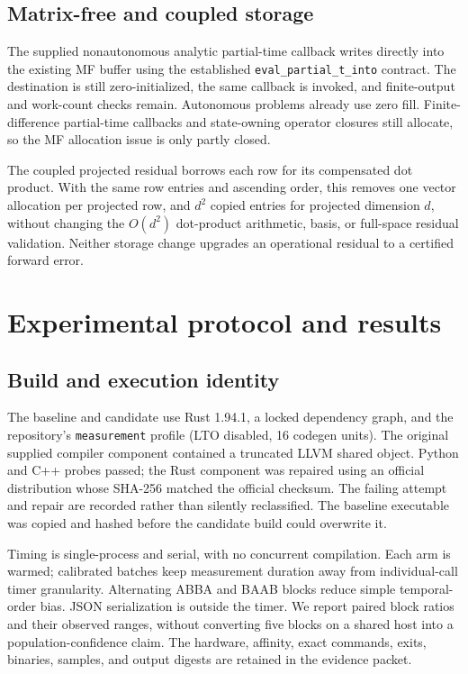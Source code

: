 \documentclass[aps,prd,reprint,amsmath,amssymb,longbibliography,nofootinbib]{revtex4-2}
\newcommand{\code}[1]{\texttt{#1}}
\begin{document}
\subsection{Matrix-free and coupled storage}
The supplied nonautonomous analytic partial-time callback writes directly into the existing MF buffer using the established \code{eval\_partial\_t\_into} contract. The destination is still zero-initialized, the same callback is invoked, and finite-output and work-count checks remain. Autonomous problems already use zero fill. Finite-difference partial-time callbacks and state-owning operator closures still allocate, so the MF allocation issue is only partly closed.

The coupled projected residual borrows each row for its compensated dot product. With the same row entries and ascending order, this removes one vector allocation per projected row, and $d^2$ copied entries for projected dimension $d$, without changing the $O(d^2)$ dot-product arithmetic, basis, or full-space residual validation. Neither storage change upgrades an operational residual to a certified forward error.

\section{Experimental protocol and results}
\label{sec:experiments}
\subsection{Build and execution identity}
The baseline and candidate use Rust 1.94.1, a locked dependency graph, and the repository's \code{measurement} profile (LTO disabled, 16 codegen units). The original supplied compiler component contained a truncated LLVM shared object. Python and C++ probes passed; the Rust component was repaired using an official distribution whose SHA-256 matched the official checksum. The failing attempt and repair are recorded rather than silently reclassified. The baseline executable was copied and hashed before the candidate build could overwrite it.

Timing is single-process and serial, with no concurrent compilation. Each arm is warmed; calibrated batches keep measurement duration away from individual-call timer granularity. Alternating ABBA and BAAB blocks reduce simple temporal-order bias. JSON serialization is outside the timer. We report paired block ratios and their observed ranges, without converting five blocks on a shared host into a population-confidence claim. The hardware, affinity, exact commands, exits, binaries, samples, and output digests are retained in the evidence packet.
\end{document}
